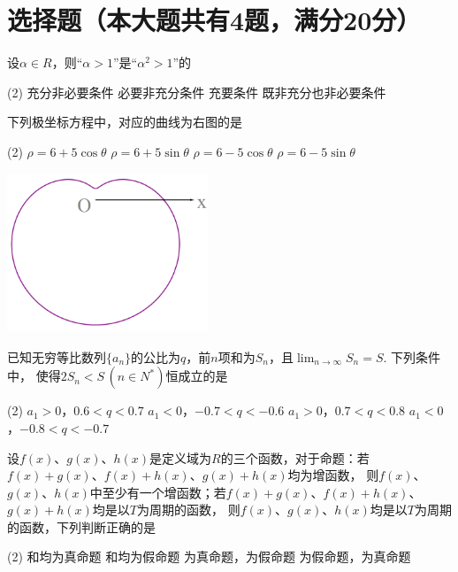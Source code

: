 \documentclass[12pt,space]{ctexart} %
\begin{document}
\section{选择题（本大题共有4题，满分20分）}
\begin{enumerate}[itemsep=-0.3em,topsep=0pt, resume]

  \item 设$\alpha\in R$，则“$\alpha>1$”是“$\alpha^2>1$”的
  \begin{tasks}(2)
    \task 充分非必要条件 \task 必要非充分条件 \task 充要条件 \task 既非充分也非必要条件
  \end{tasks}\vspace{1em}
  
  \begin{minipage}[h][5em][t]{.6\textwidth}
    \item 下列极坐标方程中，对应的曲线为右图的是
    \begin{tasks}(2)
      \task $\rho=6+5\cos\theta$ \task $\rho=6+5\sin\theta$ \task $\rho=6-5\cos\theta$ \task $\rho=6-5\sin\theta$
    \end{tasks}
  \end{minipage}
  \begin{minipage}[h][4em][b]{.3\textwidth}
    \centering\includegraphics[width=0.45\textwidth]{Image/sh-16.png}
  \end{minipage}

  \item 已知无穷等比数列$\{a_n\}$的公比为$q$，前$n$项和为$S_n$，且$\lim_{n\rightarrow\infty}S_n=S$. 下列条件中，
        使得$2S_n<S\,(n\in N^*)$恒成立的是
  \begin{tasks}(2)
    \task $a_1>0$，$0.6<q<0.7$ \task $a_1<0$，$-0.7<q<-0.6$ 
    \task $a_1>0$，$0.7<q<0.8$ \task $a_1<0$，$-0.8<q<-0.7$ 
  \end{tasks}

  \item 设$f(x)$、$g(x)$、$h(x)$是定义域为$R$的三个函数，对于命题：若$f(x)+g(x)$、$f(x)+h(x)$、$g(x)+h(x)$均为增函数，
        则$f(x)$、$g(x)$、$h(x)$中至少有一个增函数；若$f(x)+g(x)$、$f(x)+h(x)$、$g(x)+h(x)$均是以$T$为周期的函数，
        则$f(x)$、$g(x)$、$h(x)$均是以$T$为周期的函数，下列判断正确的是
  \begin{tasks}(2)
    \task {}和均为真命题 \task {}和均为假命题
    \task {}为真命题，为假命题 \task {}为假命题，为真命题
  \end{tasks}

\end{enumerate}
\end{document}
